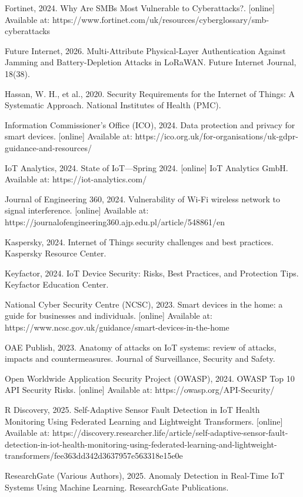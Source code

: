 Fortinet, 2024. Why Are SMBs Most Vulnerable to Cyberattacks?. [online] Available at: https://www.fortinet.com/uk/resources/cyberglossary/smb-cyberattacks

Future Internet, 2026. Multi-Attribute Physical-Layer Authentication Against Jamming and Battery-Depletion Attacks in LoRaWAN. Future Internet Journal, 18(38).

Hassan, W. H., et al., 2020. Security Requirements for the Internet of Things: A Systematic Approach. National Institutes of Health (PMC).

Information Commissioner's Office (ICO), 2024. Data protection and privacy for smart devices. [online] Available at: https://ico.org.uk/for-organisations/uk-gdpr-guidance-and-resources/

IoT Analytics, 2024. State of IoT---Spring 2024. [online] IoT Analytics GmbH. Available at: https://iot-analytics.com/

Journal of Engineering 360, 2024. Vulnerability of Wi-Fi wireless network to signal interference. [online] Available at: https://journalofengineering360.ajp.edu.pl/article/548861/en

Kaspersky, 2024. Internet of Things security challenges and best practices. Kaspersky Resource Center.

Keyfactor, 2024. IoT Device Security: Risks, Best Practices, and Protection Tips. Keyfactor Education Center.

National Cyber Security Centre (NCSC), 2023. Smart devices in the home: a guide for businesses and individuals. [online] Available at: https://www.ncsc.gov.uk/guidance/smart-devices-in-the-home

OAE Publish, 2023. Anatomy of attacks on IoT systems: review of attacks, impacts and countermeasures. Journal of Surveillance, Security and Safety.

Open Worldwide Application Security Project (OWASP), 2024. OWASP Top 10 API Security Risks. [online] Available at: https://owasp.org/API-Security/

R Discovery, 2025. Self-Adaptive Sensor Fault Detection in IoT Health Monitoring Using Federated Learning and Lightweight Transformers. [online] Available at: https://discovery.researcher.life/article/self-adaptive-sensor-fault-detection-in-iot-health-monitoring-using-federated-learning-and-lightweight-transformers/fee363dd342d3637957e563318e15e0e

ResearchGate (Various Authors), 2025. Anomaly Detection in Real-Time IoT Systems Using Machine Learning. ResearchGate Publications.

